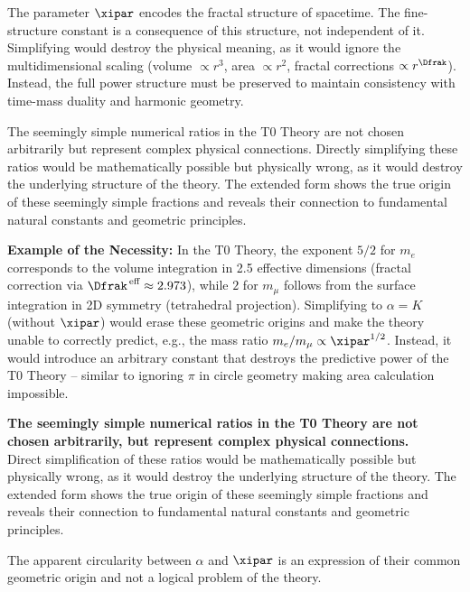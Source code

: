 	The parameter $\xipar$ encodes the fractal structure of spacetime. The fine-structure constant is a consequence of this structure, not independent of it. Simplifying would destroy the physical meaning, as it would ignore the multidimensional scaling (volume $\propto r^3$, area $\propto r^2$, fractal corrections $\propto r^{\Dfrak}$). Instead, the full power structure must be preserved to maintain consistency with time-mass duality and harmonic geometry.
	
	The seemingly simple numerical ratios in the T0 Theory are not chosen arbitrarily but represent complex physical connections. Directly simplifying these ratios would be mathematically possible but physically wrong, as it would destroy the underlying structure of the theory. The extended form shows the true origin of these seemingly simple fractions and reveals their connection to fundamental natural constants and geometric principles.
	
	\textbf{Example of the Necessity:} In the T0 Theory, the exponent $5/2$ for $m_e$ corresponds to the volume integration in 2.5 effective dimensions (fractal correction via $\Dfrak^{\,\text{eff}} \approx 2.973$), while $2$ for $m_\mu$ follows from the surface integration in 2D symmetry (tetrahedral projection). Simplifying to $\alpha = K$ (without $\xipar$) would erase these geometric origins and make the theory unable to correctly predict, e.g., the mass ratio $m_e/m_\mu \propto \xipar^{1/2}$. Instead, it would introduce an arbitrary constant that destroys the predictive power of the T0 Theory – similar to ignoring $\pi$ in circle geometry making area calculation impossible.
	
	\begin{tcolorbox}[colback=blue!5!white,colframe=blue!75!black,title=Key Result]
		\textbf{The seemingly simple numerical ratios in the T0 Theory are not chosen arbitrarily, but represent complex physical connections.} \\
		
		Direct simplification of these ratios would be mathematically possible but physically wrong, as it would destroy the underlying structure of the theory. The extended form shows the true origin of these seemingly simple fractions and reveals their connection to fundamental natural constants and geometric principles.
		
		The apparent circularity between $\alpha$ and $\xipar$ is an expression of their common geometric origin and not a logical problem of the theory.
	\end{tcolorbox}
